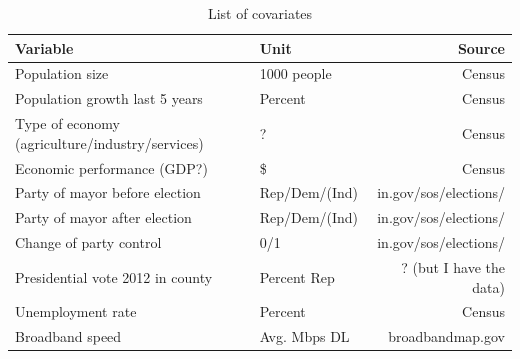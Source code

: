 \documentclass[11pt]{article}
\begin{document}
\begin{table}[ht]
	\centering
	\begin{tabular}{llr}
		\hline
		Variable & Unit & Source \\
		\hline
		Population size & 1000 people & Census \\
		Population growth last 5 years & Percent & Census \\
		Type of economy (agriculture/industry/services) & ? & Census \\
		Economic performance (GDP?) & \$ & Census \\
		Party of mayor before election & Rep/Dem/(Ind) & in.gov/sos/elections/ \\
		Party of mayor after election & Rep/Dem/(Ind) & in.gov/sos/elections/ \\
		Change of party control & 0/1 & in.gov/sos/elections/ \\
		Presidential vote 2012 in county & Percent Rep & ? (but I have the data) \\
		Unemployment rate & Percent & Census \\
		Broadband speed & Avg. Mbps DL & broadbandmap.gov \\
		\hline
	\end{tabular}
	\caption{List of covariates} 
\end{table}
\end{document}
